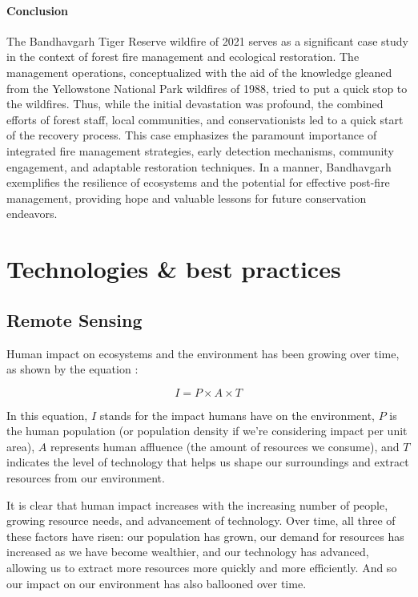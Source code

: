 \documentclass[
  12 pt,
]{Nemilov}
\begin{document}
\subsection{Conclusion}\label{conclusion-1}

The Bandhavgarh Tiger Reserve wildfire of 2021 serves as a significant case study in the context of forest fire management and ecological restoration. The management operations, conceptualized with the aid of the knowledge gleaned from the Yellowstone National Park wildfires of 1988, tried to put a quick stop to the wildfires. Thus, while the initial devastation was profound, the combined efforts of forest staff, local communities, and conservationists led to a quick start of the recovery process. This case emphasizes the paramount importance of integrated fire management strategies, early detection mechanisms, community engagement, and adaptable restoration techniques. In a manner, Bandhavgarh exemplifies the resilience of ecosystems and the potential for effective post-fire management, providing hope and valuable lessons for future conservation endeavors.

\part{Technologies \& best practices}\label{part-technologies-best-practices}

\chapter{Remote Sensing}\label{remote-sensing}

Human impact on ecosystems and the environment has been growing over time, as shown by the equation \citep{awadhiya2021principles}:

\[I = P \times A \times T\]

In this equation, \(I\) stands for the impact humans have on the environment, \(P\) is the human population (or population density if we're considering impact per unit area), \(A\) represents human affluence (the amount of resources we consume), and \(T\) indicates the level of technology that helps us shape our surroundings and extract resources from our environment.

It is clear that human impact increases with the increasing number of people, growing resource needs, and advancement of technology. Over time, all three of these factors have risen: our population has grown, our demand for resources has increased as we have become wealthier, and our technology has advanced, allowing us to extract more resources more quickly and more efficiently. And so our impact on our environment has also ballooned over time.
\end{document}
